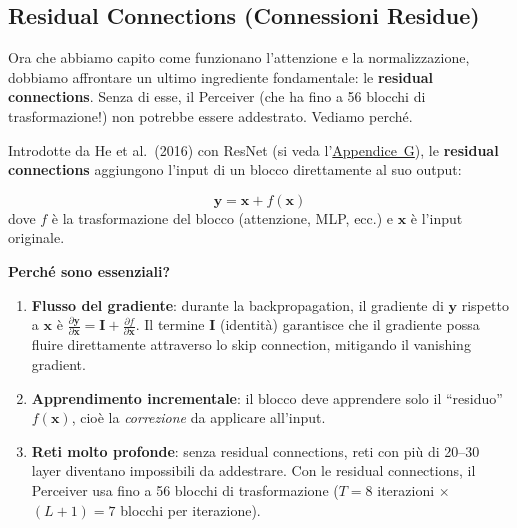 \documentclass[12pt,a4paper]{article}
\begin{document}
\subsection{Residual Connections (Connessioni Residue)} \label{sec:residual}

Ora che abbiamo capito come funzionano l'attenzione e la normalizzazione, dobbiamo affrontare un ultimo ingrediente fondamentale: le \textbf{residual connections}. Senza di esse, il Perceiver (che ha fino a 56 blocchi di trasformazione!) non potrebbe essere addestrato. Vediamo perch\'e.

Introdotte da He et al.\ (2016) con ResNet (si veda l'\hyperref[app:resnet]{Appendice~G}), le \textbf{residual connections} aggiungono l'input di un blocco direttamente al suo output:

\begin{formulabox}
\[
    \mathbf{y} = \mathbf{x} + f(\mathbf{x})
\]
dove $f$ \`e la trasformazione del blocco (attenzione, MLP, ecc.) e $\mathbf{x}$ \`e l'input originale.
\end{formulabox}

\textbf{Perch\'e sono essenziali?}
\begin{enumerate}
    \item \textbf{Flusso del gradiente}: durante la backpropagation, il gradiente di $\mathbf{y}$ rispetto a $\mathbf{x}$ \`e $\frac{\partial \mathbf{y}}{\partial \mathbf{x}} = \mathbf{I} + \frac{\partial f}{\partial \mathbf{x}}$. Il termine $\mathbf{I}$ (identit\`a) garantisce che il gradiente possa fluire direttamente attraverso lo skip connection, mitigando il vanishing gradient.
    \item \textbf{Apprendimento incrementale}: il blocco deve apprendere solo il ``residuo'' $f(\mathbf{x})$, cio\`e la \emph{correzione} da applicare all'input.
    \item \textbf{Reti molto profonde}: senza residual connections, reti con pi\`u di 20--30 layer diventano impossibili da addestrare. Con le residual connections, il Perceiver usa fino a 56 blocchi di trasformazione ($T = 8$ iterazioni $\times$ $(L+1) = 7$ blocchi per iterazione).
\end{enumerate}
\end{document}
